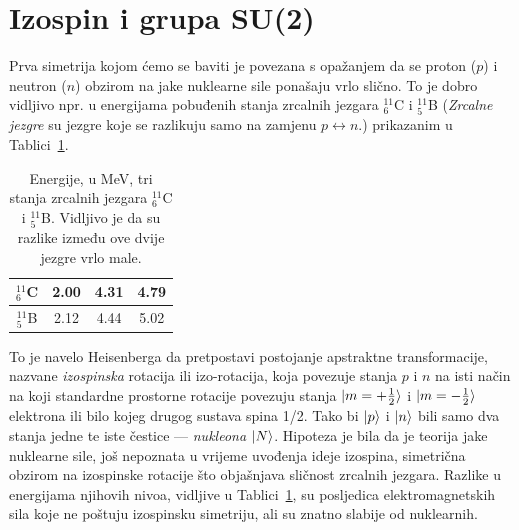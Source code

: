 \section{Izospin i grupa SU(2)}
\label{sec:izospin} 
Prva simetrija kojom ćemo se baviti je povezana s opažanjem da se
proton ($p$) i neutron ($n$) obzirom na jake nuklearne
sile ponašaju vrlo slično. To je dobro vidljivo npr. u energijama
pobuđenih stanja zrcalnih jezgara $^{11}_{6}$C i $^{11}_{5}$B 
(\emph{Zrcalne jezgre} su jezgre koje se razlikuju samo na zamjenu
$p \leftrightarrow n$.) prikazanim u Tablici~\ref{tab:mirror}.
\begin{table}
\caption{\label{tab:mirror}Energije, u MeV, tri stanja zrcalnih jezgara
$^{11}_{6}$C i $^{11}_{5}$B.  Vidljivo je da su razlike između ove dvije
jezgre vrlo male.}
\begin{center}
\renewcommand{\arraystretch}{1.5}
\begin{tabular}{c|ccc}
$^{11}_{6}$C & 2.00 & 4.31 & 4.79 \\ \hline
$^{11}_{5}$B & 2.12 & 4.44 & 5.02
\end{tabular}
\renewcommand{\arraystretch}{1.0}
\end{center}
\end{table}
To je navelo Heisenberga da pretpostavi postojanje apstraktne transformacije,
nazvane \emph{izospinska} rotacija ili izo-rotacija,
 
koja povezuje stanja $p$ i $n$ na isti način na koji standardne prostorne rotacije
povezuju stanja $| m=+\frac{1}{2} \rangle$ i $| m=-\frac{1}{2} \rangle$
elektrona ili bilo kojeg drugog sustava spina 1/2. Tako bi $| p \rangle$ i $| n \rangle$
bili samo dva stanja jedne te iste čestice --- \emph{nukleona} $| N \rangle$.
Hipoteza je bila da je teorija jake nuklearne sile,
još nepoznata u vrijeme uvođenja ideje izospina,
simetrična obzirom na izospinske rotacije što objašnjava sličnost
zrcalnih jezgara. Razlike u energijama njihovih nivoa, vidljive u
Tablici~\ref{tab:mirror}, su posljedica elektromagnetskih sila koje
ne poštuju izospinsku simetriju, ali su znatno slabije od nuklearnih.

